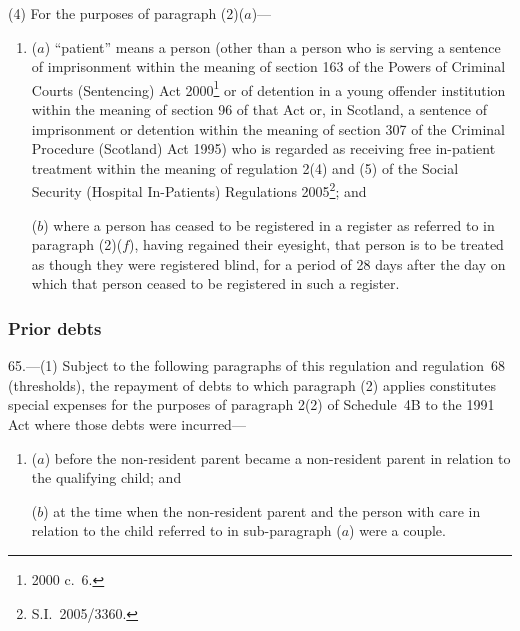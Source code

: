 \documentclass[12pt,a4paper]{article}
\begin{document}
(4) For the purposes of paragraph (2)($a$)—
\begin{enumerate}\item[]
($a$) “patient” means a person (other than a person who is serving a sentence of imprisonment within the meaning of section 163 of the Powers of Criminal Courts (Sentencing) Act 2000\footnote{2000 c.~6.} or of detention in a young offender institution within the meaning of section 96 of that Act or, in Scotland, a sentence of imprisonment or detention within the meaning of section 307 of the Criminal Procedure (Scotland) Act 1995) who is regarded as receiving free in-patient treatment within the meaning of regulation 2(4) and (5) of the Social Security (Hospital In-Patients) Regulations 2005\footnote{S.I.~2005/3360.}; and

($b$) where a person has ceased to be registered in a register as referred to in paragraph (2)($f$), having regained their eyesight, that person is to be treated as though they were registered blind, for a period of 28 days after the day on which that person ceased to be registered in such a register.
\end{enumerate}


\subsubsection[65. Prior debts]{Prior debts}

65.---(1)  Subject to the following paragraphs of this regulation and regulation~68 (thresholds), the repayment of debts to which paragraph (2) applies constitutes special expenses for the purposes of paragraph 2(2) of Schedule~4B to the 1991 Act where those debts were incurred—
\begin{enumerate}\item[]
($a$) before the non-resident parent became a non-resident parent in relation to the qualifying child; and

($b$) at the time when the non-resident parent and the person with care in relation to the child referred to in sub-paragraph ($a$)  were a couple.
\end{enumerate}
\end{document}
